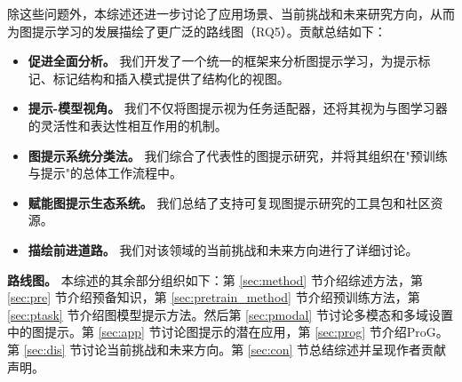 除这些问题外，本综述还进一步讨论了应用场景、当前挑战和未来研究方向，从而为图提示学习的发展描绘了更广泛的路线图（RQ5）。贡献总结如下：

\begin{itemize}
    \item \textbf{促进全面分析。} 我们开发了一个统一的框架来分析图提示学习，为提示标记、标记结构和插入模式提供了结构化的视图。
    \item \textbf{提示-模型视角。} 我们不仅将图提示视为任务适配器，还将其视为与图学习器的灵活性和表达性相互作用的机制。
    \item \textbf{图提示系统分类法。} 我们综合了代表性的图提示研究，并将其组织在"预训练与提示"的总体工作流程中。
    \item \textbf{赋能图提示生态系统。} 我们总结了支持可复现图提示研究的工具包和社区资源。
    \item \textbf{描绘前进道路。} 我们对该领域的当前挑战和未来方向进行了详细讨论。
\end{itemize}


\textbf{路线图。} 本综述的其余部分组织如下：第 \ref{sec:method} 节介绍综述方法，第 \ref{sec:pre} 节介绍预备知识，第 \ref{sec:pretrain_method} 节介绍预训练方法，第 \ref{sec:ptask} 节介绍图模型提示方法。然后第 \ref{sec:pmodal} 节讨论多模态和多域设置中的图提示。第 \ref{sec:app} 节讨论图提示的潜在应用，第 \ref{sec:prog} 节介绍ProG。第 \ref{sec:dis} 节讨论当前挑战和未来方向。第 \ref{sec:con} 节总结综述并呈现作者贡献声明。
